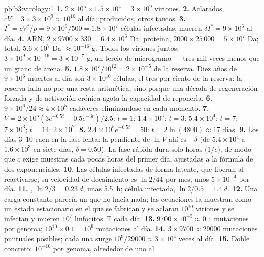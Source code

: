 \begin{solution}{pb:b3:virology:1}
\textbf{1.} $2\times 10^{5}\times 1.5\times 10^{4} = 3\times 10^{9}$
viriones.
\textbf{2.} Aclarados, $cV = 3\times 3\times 10^{9} \approx 10^{10}$ al
día; producidos, otros tantos.
\textbf{3.} $I^{*} = cV^{*}/p = 9\times 10^{9}/500 = 1.8\times 10^{7}$
células infectadas; mueren $\delta I^{*} = 9\times 10^{6}$ al día.
\textbf{4.} ARN, $2\times 9700\times 330 = 6.4\times 10^{6}$ Da;
proteína, $2000\times 25\,000 = 5\times 10^{7}$ Da; total,
$5.6\times 10^{7}$ Da $\approx 10^{-16}$ g. Todos los viriones juntos:
$3\times 10^{9}\times
10^{-16} = 3\times 10^{-7}$ g, un tercio de microgramo --- tres mil veces
menos que un grano de arena.
\textbf{5.} $1.8\times 10^{7}/10^{12} = 2\times 10^{-5}$ de la reserva.
Diez años de $9\times 10^{6}$ muertes al día son $3\times 10^{10}$
células, el tres por ciento de la reserva: la reserva falla no por una
resta aritmética, sino porque una década de regeneración forzada y de
activación crónica agota la capacidad de reponerla.
\textbf{6.} $9\times 10^{6}/24 \approx 4\times 10^{5}$ cadáveres
eliminándose en cada momento.
\textbf{7.} $V = 2\times 10^{5}(3e^{-0.5t} - 0.5e^{-3t})/2.5$: $t = 1$:
$1.4\times 10^{5}$; $t = 3$: $5.4\times 10^{4}$; $t = 7$: $7\times
10^{3}$; $t = 14$: $2\times 10^{2}$.
\textbf{8.} $2.4\times 10^{5}e^{-0.5t} = 50$: $t = 2\ln(4800) \approx 17$
días.
\textbf{9.} Los días 3--10 caen en la fase lenta: la pendiente de $\ln V$
ahí es $-\delta$ (de $5.4\times 10^{4}$ a $1.6\times 10^{3}$ en siete
días, $\delta = 0.50$). La fase rápida dura solo horas ($1/c$), de modo
que $c$ exige muestras cada pocas horas del primer día, ajustadas a la
fórmula de dos exponenciales.
\textbf{10.} Las células infectadas de forma latente, que liberan 
al reactivarse; su velocidad de decaimiento es $\ln 2/44$ por mes, unos
$5\times 10^{-4}$ por día.
\textbf{11.} , $\ln 2/3 = \qty{0.23}{d}$, unas \qty{5.5}{h};
célula infectada, $\ln 2/0.5 = \qty{1.4}{d}$.
\textbf{12.} Una carga constante parecía un  que no hacía nada; las
ecuaciones la muestran como un estado estacionario en el que se fabrican
y se aclaran $10^{10}$ viriones y se infectan y mueren $10^{7}$
linfocitos~T cada día.
\textbf{13.} $9700\times 10^{-5} \approx 0.1$ mutaciones por genoma;
$10^{10}\times 0.1 = 10^{9}$ mutaciones al día.
\textbf{14.} $3\times 9700 \approx \num{29000}$ mutaciones puntuales
posibles; cada una surge $10^{9}/\num{29000} \approx 3\times 10^{4}$
veces al día.
\textbf{15.} Doble concreto: $10^{-10}$ por genoma, alrededor de uno al

\end{solution}
